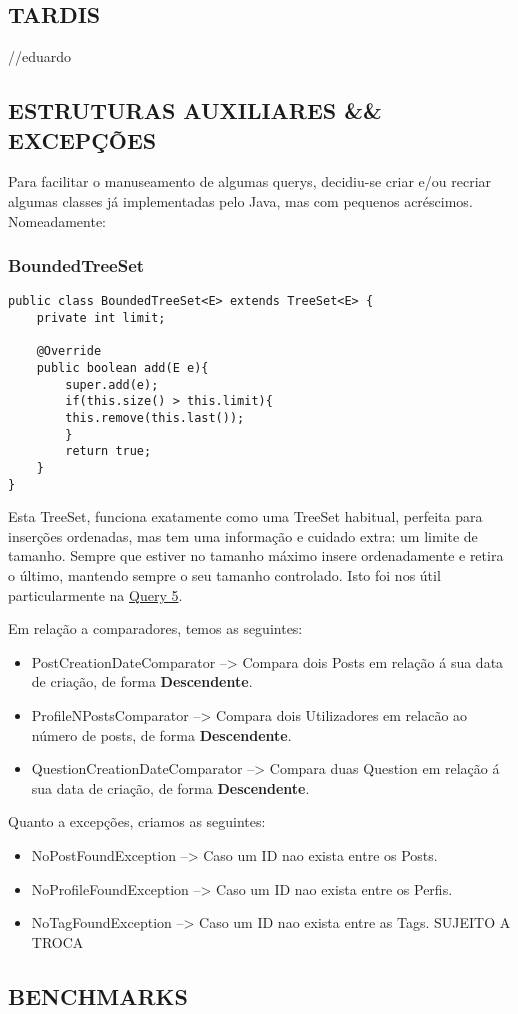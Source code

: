 \documentclass[letterpaper, 10 pt, conference]{IEEEtran}  %
\begin{document}
\subsection{TARDIS}
//eduardo



\subsection{ESTRUTURAS AUXILIARES && EXCEPÇÕES}
Para facilitar o manuseamento de algumas querys, decidiu-se criar e/ou recriar algumas classes já implementadas
pelo Java, mas com pequenos acréscimos. Nomeadamente:
\subsubsection{BoundedTreeSet}
\begin{lstlisting}
public class BoundedTreeSet<E> extends TreeSet<E> {
    private int limit;

    @Override
    public boolean add(E e){
        super.add(e);
        if(this.size() > this.limit){
        this.remove(this.last());
        }
        return true;
    }
}
\end{lstlisting}
Esta TreeSet, funciona exatamente como uma TreeSet habitual, perfeita para inserções ordenadas, mas tem
uma informação e cuidado extra: um limite de tamanho. Sempre que estiver no tamanho máximo insere ordenadamente
e retira o último, mantendo sempre o seu tamanho controlado. Isto foi nos útil particularmente na \underline{Query 5}.


Em relação a comparadores, temos as seguintes:
\begin{itemize}
    \item PostCreationDateComparator --> Compara dois Posts em relação á sua data de criação, de forma \textbf{Descendente}.
    \item ProfileNPostsComparator --> Compara dois Utilizadores em relacão ao número de posts, de forma \textbf{Descendente}.
    \item QuestionCreationDateComparator --> Compara duas Question em relação á sua data de criação, de forma \textbf{Descendente}.
\end{itemize}


Quanto a excepções, criamos as seguintes:
\begin{itemize}
    \item NoPostFoundException --> Caso um ID nao exista entre os Posts.
    \item NoProfileFoundException --> Caso um ID nao exista entre os Perfis.
    \item NoTagFoundException --> Caso um ID nao exista entre as Tags. SUJEITO A TROCA
\end{itemize}
\subsection{BENCHMARKS}
\end{document}
